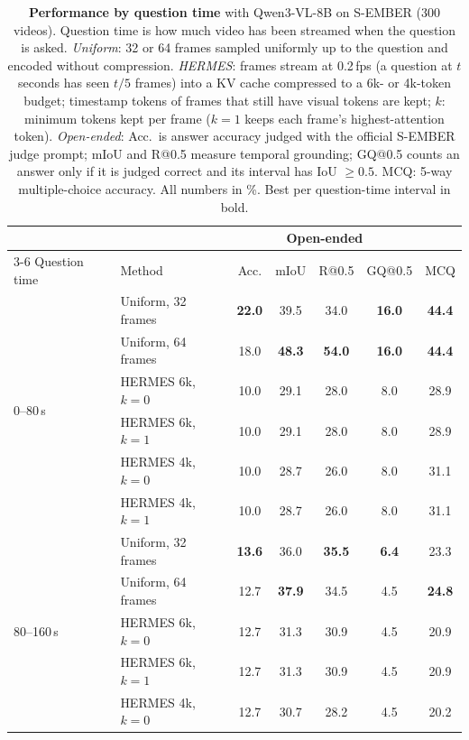 \begin{table}[t]
\centering
\setlength{\tabcolsep}{8pt}
\caption{\textbf{Performance by question time} with Qwen3-VL-8B on S-EMBER (300 videos). Question time is how much video has been streamed when the question is asked. \emph{Uniform}: 32 or 64 frames sampled uniformly up to the question and encoded without compression. \emph{HERMES}: frames stream at 0.2\,fps (a question at $t$ seconds has seen $t/5$ frames) into a KV cache compressed to a 6k- or 4k-token budget; timestamp tokens of frames that still have visual tokens are kept; $k$: minimum tokens kept per frame ($k{=}1$ keeps each frame's highest-attention token). \emph{Open-ended}: Acc.\ is answer accuracy judged with the official S-EMBER judge prompt; mIoU and R@0.5 measure temporal grounding; GQ@0.5 counts an answer only if it is judged correct and its interval has IoU $\geq 0.5$. MCQ: 5-way multiple-choice accuracy. All numbers in \%. Best per question-time interval in bold.}
\label{tab:question-time}
\begin{tabular}{llccccc}
\toprule
& & \multicolumn{4}{c}{Open-ended} & \\
\cmidrule(lr){3-6}
Question time & Method & Acc. & mIoU & R@0.5 & GQ@0.5 & MCQ \\
\midrule
\multirow{6}{*}{0--80\,s} & Uniform, 32 frames & \textbf{22.0} & 39.5 & 34.0 & \textbf{16.0} & \textbf{44.4} \\
 & Uniform, 64 frames & 18.0 & \textbf{48.3} & \textbf{54.0} & \textbf{16.0} & \textbf{44.4} \\
\cmidrule(lr){2-7}
 & HERMES 6k, $k{=}0$ & 10.0 & 29.1 & 28.0 & 8.0 & 28.9 \\
 & HERMES 6k, $k{=}1$ & 10.0 & 29.1 & 28.0 & 8.0 & 28.9 \\
 & HERMES 4k, $k{=}0$ & 10.0 & 28.7 & 26.0 & 8.0 & 31.1 \\
 & HERMES 4k, $k{=}1$ & 10.0 & 28.7 & 26.0 & 8.0 & 31.1 \\
\midrule
\multirow{6}{*}{80--160\,s} & Uniform, 32 frames & \textbf{13.6} & 36.0 & \textbf{35.5} & \textbf{6.4} & 23.3 \\
 & Uniform, 64 frames & 12.7 & \textbf{37.9} & 34.5 & 4.5 & \textbf{24.8} \\
\cmidrule(lr){2-7}
 & HERMES 6k, $k{=}0$ & 12.7 & 31.3 & 30.9 & 4.5 & 20.9 \\
 & HERMES 6k, $k{=}1$ & 12.7 & 31.3 & 30.9 & 4.5 & 20.9 \\
 & HERMES 4k, $k{=}0$ & 12.7 & 30.7 & 28.2 & 4.5 & 20.2 \\

\end{tabular}
\end{table}

